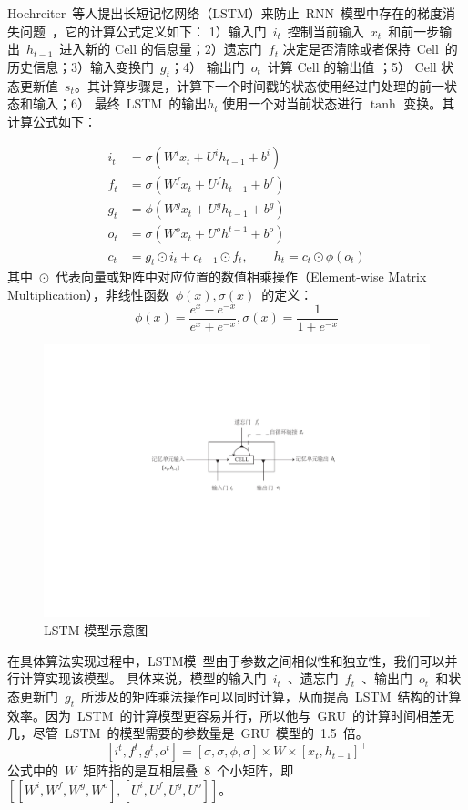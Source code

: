 Hochreiter~等人提出长短记忆网络（LSTM）来防止~RNN~模型中存在的梯度消失问题~，它的计算公式定义如下： 1）输入门~$i_t$~控制当前输入~$x_t$~和前一步输出~$h_{t−1}$~进入新的 Cell 的信息量；2）遗忘门~$f_t$ 决定是否清除或者保持~Cell~的历史信息；3）输入变换门~$g_t$；4） 输出门~$o_t$~计算 Cell 的输出值 ；5） Cell 状态更新值~$s_t$。其计算步骤是，计算下一个时间戳的状态使用经过门处理的前一状态和输入；6） 最终~LSTM~的输出$h_t$ 使用一个对当前状态进行 $\tanh$ 变换。其计算公式如下：

\begin{equation}\label{equ:lstm}
\begin{split}
   i_t&=\sigma(W^i x_t+U^i h_{t-1}+b^i) \\
   f_t&=\sigma(W^f x_t+U^f h_{t-1}+b^f) \\
   g_t&=\phi(W^g x_t+U^g h_{t-1}+b^g) \\
   o_t&=\sigma(W^o x_t+U^o h^{t-1}+b^o) \\
   c_t&=g_t\odot i_t+c_{t-1}\odot f_t,\qquad h_t=c_t\odot \phi(o_t)
\end{split}
\end{equation}
其中~$\odot$~代表向量或矩阵中对应位置的数值相乘操作（Element-wise Matrix Multiplication），非线性函数~$\phi(x),\sigma(x)$~的定义：
\begin{equation}\label{equ:phi_sigma}
  \phi(x)=\frac{e^x-e^{-x}}{e^x+e^{-x}},\sigma(x)=\frac{1}{1+e^{-x}}
\end{equation}

\begin{figure}[!t]
  \centering
  \includegraphics[width=.8\linewidth]{./figures/lstm.pdf}
  \caption{LSTM 模型示意图}\label{fig:lstm}
\end{figure}

在具体算法实现过程中，LSTM模~型由于参数之间相似性和独立性，我们可以并行计算实现该模型。
具体来说，模型的输入门~$i_t$~、遗忘门~$f_t$~、输出门~$o_t$~和状态更新门~$g_t$~所涉及的矩阵乘法操作可以同时计算，从而提高~LSTM~结构的计算效率。因为~LSTM~的计算模型更容易并行，所以他与~GRU~的计算时间相差无几，尽管~LSTM~的模型需要的参数量是~GRU~模型的~1.5~倍。
\begin{equation}\label{equ:weight}
[i^t,f^t,g^t,o^t ]=[\sigma, \sigma,\phi,\sigma]\times W\times[x_t,h_{t-1}]^\top
\end{equation}
公式中的~$W$~矩阵指的是互相层叠~8~个小矩阵，即 $[[W^i,W^f,W^g,W^o],[U^i,U^f,U^g,U^o]]$。


